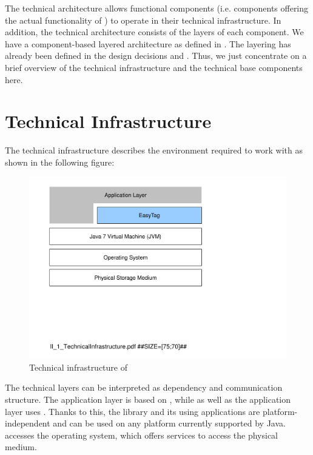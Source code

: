 The technical architecture allows functional components (i.e. components offering the actual functionality of \LibName{}) to operate in their technical infrastructure. In addition, the technical architecture consists of the layers of each component. We have a component-based layered architecture as defined in . The layering has already been defined in the design decisions  and . Thus, we just concentrate on a brief overview of the technical infrastructure and the technical base components here.


\section{Technical Infrastructure}
\label{sec:TechnicalInfrastructure}

The technical infrastructure describes the environment required to work with \LibName{} as shown in the following figure:

\begin{figure}[H]
\centering
\includegraphics[width=1.00\textwidth]{figures/II_TechnicalInfrastructure.pdf}
\caption{Technical infrastructure of \LibName{}}
\label{fig:5_3_SCH_TechnicalInfrastructure}
\end{figure}

The technical layers can be interpreted as dependency and communication structure. The application layer is based on \LibName{}, while \LibName{} as well as the application layer uses \JavaVersion{}. Thanks to this, the library and its using applications are platform-independent and can be used on any platform currently supported by Java. \JavaVersion{} accesses the operating system, which offers services to access the physical medium.

